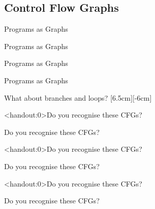 \documentclass[xcolor={dvipsnames}]{beamer}
\begin{document}
\subsection{Control Flow Graphs}
\begin{frame}{Programs as Graphs}
\end{frame}
\begin{frame}{Programs as Graphs}
\end{frame}
\begin{frame}{Programs as Graphs}
\end{frame}
\begin{frame}{Programs as Graphs}
\end{frame}
\begin{frame}{What about branches and loops?}
    [6.5cm][-6cm]
\end{frame}
\begin{frame}<handout:0>{Do you recognise these CFGs?}
    \centering
\end{frame}
\begin{frame}[noframenumbering]{Do you recognise these CFGs?}
    \centering
\end{frame}
\begin{frame}<handout:0>{Do you recognise these CFGs?}
    \centering
\end{frame}
\begin{frame}[noframenumbering]{Do you recognise these CFGs?}
    \centering
\end{frame}
\begin{frame}<handout:0>{Do you recognise these CFGs?}
    \centering
\end{frame}
\begin{frame}[noframenumbering]{Do you recognise these CFGs?}
    \centering
\end{frame}
\end{document}
